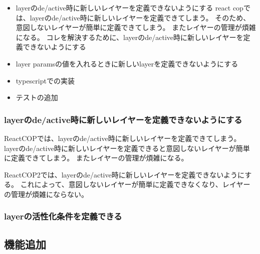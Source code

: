 \documentclass{jsarticle}
\begin{document}
\begin{itemize}
	\item layerのde/active時に新しいレイヤーを定義できないようにする
	      react copでは、layerのde/active時に新しいレイヤーを定義できてしまう。
	      そのため、意図しないレイヤーが簡単に定義できてしまう。
	      またレイヤーの管理が煩雑になる。
	      コレを解決するために、layerのde/active時に新しいレイヤーを定義できないようにする
	\item layer paramsの値を入れるときに新しいlayerを定義できないようにする
	\item typescriptでの実装
	\item テストの追加
\end{itemize}


\subsubsection{layerのde/active時に新しいレイヤーを定義できないようにする}
ReactCOPでは、layerのde/active時に新しいレイヤーを定義できてしまう。
layerのde/active時に新しいレイヤーを定義できると意図しないレイヤーが簡単に定義できてしまう。
またレイヤーの管理が煩雑になる。

ReactCOP2では、layerのde/active時に新しいレイヤーを定義できないようにする。
これによって、意図しないレイヤーが簡単に定義できなくなり、レイヤーの管理が煩雑にならない。


\subsubsection{layerの活性化条件を定義できる}







\subsection{機能追加}
\end{document}
